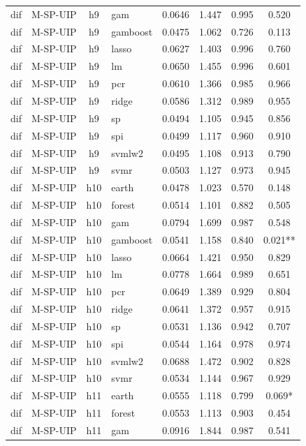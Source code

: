 \begin{ThreePartTable}
\begin{longtable}[t]{llclcccc}
dif & M-SP-UIP & h9 & gam & 0.0646 & 1.447 & 0.995 & 0.520\\
dif & M-SP-UIP & h9 & gamboost & 0.0475 & 1.062 & 0.726 & 0.113\\
dif & M-SP-UIP & h9 & lasso & 0.0627 & 1.403 & 0.996 & 0.760\\
dif & M-SP-UIP & h9 & lm & 0.0650 & 1.455 & 0.996 & 0.601\\
dif & M-SP-UIP & h9 & pcr & 0.0610 & 1.366 & 0.985 & 0.966\\
dif & M-SP-UIP & h9 & ridge & 0.0586 & 1.312 & 0.989 & 0.955\\
dif & M-SP-UIP & h9 & sp & 0.0494 & 1.105 & 0.945 & 0.856\\
dif & M-SP-UIP & h9 & spi & 0.0499 & 1.117 & 0.960 & 0.910\\
dif & M-SP-UIP & h9 & svmlw2 & 0.0495 & 1.108 & 0.913 & 0.790\\
dif & M-SP-UIP & h9 & svmr & 0.0503 & 1.127 & 0.973 & 0.945\\
\addlinespace
dif & M-SP-UIP & h10 & earth & 0.0478 & 1.023 & 0.570 & 0.148\\
dif & M-SP-UIP & h10 & forest & 0.0514 & 1.101 & 0.882 & 0.505\\
dif & M-SP-UIP & h10 & gam & 0.0794 & 1.699 & 0.987 & 0.548\\
dif & M-SP-UIP & h10 & gamboost & 0.0541 & 1.158 & 0.840 & 0.021**\\
dif & M-SP-UIP & h10 & lasso & 0.0664 & 1.421 & 0.950 & 0.829\\
dif & M-SP-UIP & h10 & lm & 0.0778 & 1.664 & 0.989 & 0.651\\
dif & M-SP-UIP & h10 & pcr & 0.0649 & 1.389 & 0.929 & 0.804\\
dif & M-SP-UIP & h10 & ridge & 0.0641 & 1.372 & 0.957 & 0.915\\
dif & M-SP-UIP & h10 & sp & 0.0531 & 1.136 & 0.942 & 0.707\\
dif & M-SP-UIP & h10 & spi & 0.0544 & 1.164 & 0.978 & 0.974\\
dif & M-SP-UIP & h10 & svmlw2 & 0.0688 & 1.472 & 0.902 & 0.828\\
dif & M-SP-UIP & h10 & svmr & 0.0534 & 1.144 & 0.967 & 0.929\\
\addlinespace
dif & M-SP-UIP & h11 & earth & 0.0555 & 1.118 & 0.799 & 0.069*\\
dif & M-SP-UIP & h11 & forest & 0.0553 & 1.113 & 0.903 & 0.454\\
dif & M-SP-UIP & h11 & gam & 0.0916 & 1.844 & 0.987 & 0.541\\

\end{longtable}
\end{ThreePartTable}
